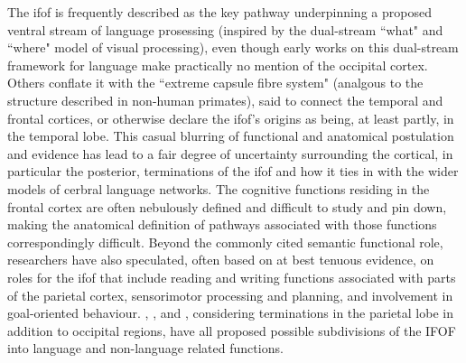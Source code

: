 The \gls{ifof} is frequently described as the key pathway underpinning a proposed ventral stream of language prosessing\autocite{Duffau2013a,Rollans2018,Voets2017,DavidPoeppel2012} (inspired by the dual-stream ``what" and ``where" model of visual processing), even though early works on this dual-stream framework for language make practically no mention of the occipital cortex.\autocite{Hickok2004,DavidPoeppel2012,Kummerer2013}
Others conflate it with the ``extreme capsule fibre system"\autocite{Friederici2013a,Zhang2018} (analgous to the structure described in non-human primates\autocite{Mandonnet2018,ThiebautdeSchotten2012}), said to connect the temporal and frontal cortices,\autocite{Kummerer2013}
or otherwise declare the \gls{ifof}'s origins as being, at least partly, in the temporal lobe.\autocite{Bajada2015a}
This casual blurring of functional and anatomical postulation and evidence has lead to a fair degree of uncertainty surrounding the cortical, in particular the posterior,\autocite{Martino2010,Forkel2014a,Weiller2021} terminations of the \gls{ifof} and how it ties in with the wider models of cerbral language networks.
\autocite{Duffau2013a, Mandonnet2018, Rollans2018, Friederici2013a}
The cognitive functions residing in the frontal cortex are often nebulously defined and difficult to study and pin down, making the anatomical definition of pathways associated with those functions correspondingly difficult.
Beyond the commonly cited semantic functional role, researchers have also speculated, often based on at best tenuous evidence, on roles for the \gls{ifof} that include reading and writing functions associated with parts of the parietal cortex,\autocite{Motomura2014} sensorimotor processing\autocite{Martino2010} and planning,\autocite{Sarubbo2013} and involvement in goal-oriented behaviour.\autocite{Conner2018}
\textcite{Sarubbo2013}, \textcite{Martino2010}, and \textcite{Rollans2018}, considering terminations in the parietal lobe in addition to occipital regions, have all proposed possible subdivisions of the IFOF into language and non-language related functions.

